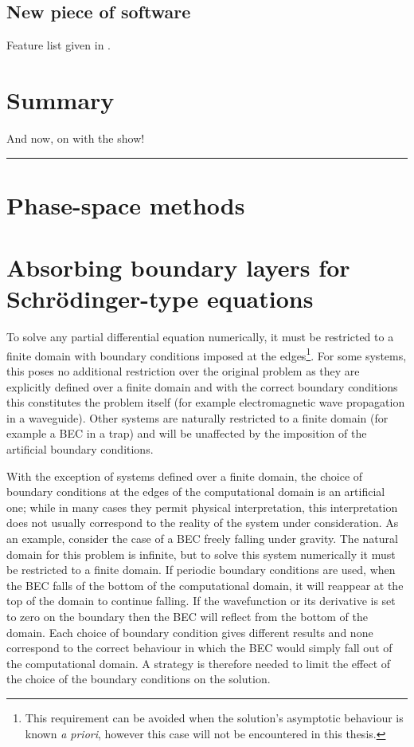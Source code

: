 \subsection{New piece of software}
Feature list given in .

\section{Summary}
And now, on with the show!
\hrule


\section{Phase-space methods}
\label{BackgroundTheory:PhaseSpaceMethods}

\section{Absorbing boundary layers for Schrödinger-type equations}
\label{BackgroundTheory:AbsorbingBoundaryLayers}


To solve any partial differential equation numerically, it must be restricted to a finite domain with boundary conditions imposed at the edges\footnote{This requirement can be avoided when the solution's asymptotic behaviour is known \emph{a priori}, however this case will not be encountered in this thesis.}. For some systems, this poses no additional restriction over the original problem as they are explicitly defined over a finite domain and with the correct boundary conditions this constitutes the problem itself (for example electromagnetic wave propagation in a waveguide). Other systems are naturally restricted to a finite domain (for example a BEC in a trap) and will be unaffected by the imposition of the artificial boundary conditions. 

With the exception of systems defined over a finite domain, the choice of boundary conditions at the edges of the computational domain is an artificial one; while in many cases they permit physical interpretation, this interpretation does not usually correspond to the reality of the system under consideration. As an example, consider the case of a BEC freely falling under gravity. The natural domain for this problem is infinite, but to solve this system numerically it must be restricted to a finite domain. If periodic boundary conditions are used, when the BEC falls of the bottom of the computational domain, it will reappear at the top of the domain to continue falling. If the wavefunction or its derivative is set to zero on the boundary then the BEC will reflect from the bottom of the domain. Each choice of boundary condition gives different results and none correspond to the correct behaviour in which the BEC would simply fall out of the computational domain. A strategy is therefore needed to limit the effect of the choice of the boundary conditions on the solution.

